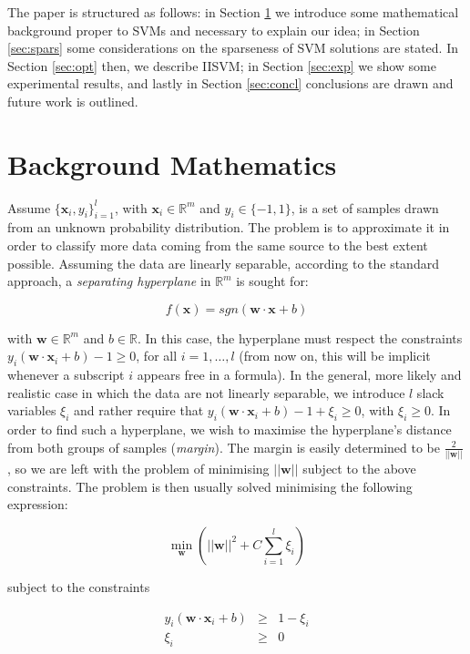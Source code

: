 \documentclass[10pt,twocolumn,letterpaper]{article}
\def\RR{\mathbb{R}}
\def\xx{\mathbf{x}}
\def\ww{\mathbf{w}}
\begin{document}
The paper is structured as follows: in Section \ref{sec:bg} we
introduce some mathematical background proper to SVMs and necessary to
explain our idea; in Section \ref{sec:spars} some considerations on
the sparseness of SVM solutions are stated. In Section \ref{sec:opt}
then, we describe IISVM; in Section \ref{sec:exp} we show some
experimental results, and lastly in Section \ref{sec:concl}
conclusions are drawn and future work is outlined.

\section{Background Mathematics}
\label{sec:bg}

Assume $\{\xx_i,y_i\}_{i=1}^l$, with $\xx_i \in \RR^m$ and $y_i \in
\{-1,1\}$, is a set of samples drawn from an unknown probability
distribution. The problem is to approximate it in order to classify
more data coming from the same source to the best extent
possible. Assuming the data are linearly separable, according to the
standard approach, a \emph{separating hyperplane} in $\RR^m$ is sought
for:

\begin{equation} \label{eqn:dec}
  f(\xx) = sgn(\ww\cdot\xx + b)
\end{equation}

with $\ww \in \RR^m$ and $b \in \RR$. In this case, the hyperplane
must respect the constraints $y_i(\ww\cdot\xx_i + b)-1\geq 0$, for all
$i = 1,\ldots,l$ (from now on, this will be implicit whenever a
subscript $i$ appears free in a formula). In the general, more likely
and realistic case in which the data are not linearly separable, we
introduce $l$ slack variables $\xi_i$ and rather require that
$y_i(\ww\cdot\xx_i + b)-1+\xi_i\geq 0$, with $\xi_i \geq 0$. In order
to find such a hyperplane, we wish to maximise the hyperplane's
distance from both groups of samples (\emph{margin}). The margin is
easily determined to be $\frac{2}{||\ww||}$, so we are left with the
problem of minimising $||\ww||$ subject to the above constraints. The
problem is then usually solved minimising the following expression:

\begin{equation} \label{eqn:svm_primal}
  \min_{\ww} \left( ||\ww||^2 + C \sum_{i=1}^l \xi_i \right)
\end{equation}

subject to the constraints

\begin{eqnarray} \label{eqn:svm_constr}
  y_i (\ww\cdot\xx_i + b) & \geq & 1-\xi_i \\
                    \xi_i & \geq & 0 \nonumber
\end{eqnarray}
\end{document}
